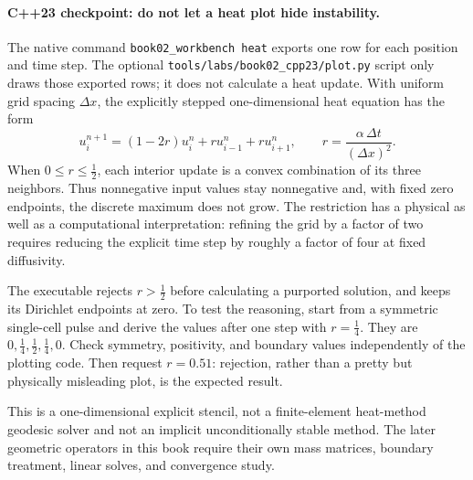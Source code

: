\begin{booktwolab}
\paragraph{C++23 checkpoint: do not let a heat plot hide instability.}
The native command \texttt{book02\_workbench heat} exports one row for
each position and time step. The optional
\texttt{tools/labs/book02\_cpp23/plot.py} script only draws those
exported rows; it does not calculate a heat update. With uniform grid
spacing \(\Delta x\), the explicitly stepped one-dimensional heat
equation has the form
\[
u_i^{n+1}=(1-2r)u_i^n+r u_{i-1}^n+r u_{i+1}^n,\qquad
r=\frac{\alpha\,\Delta t}{(\Delta x)^2}.
\]
When \(0\leq r\leq\tfrac12\), each interior update is a convex
combination of its three neighbors. Thus nonnegative input values
stay nonnegative and, with fixed zero endpoints, the discrete maximum
does not grow. The restriction has a physical as well as a computational
interpretation: refining the grid by a factor of two requires reducing
the explicit time step by roughly a factor of four at fixed diffusivity.

The executable rejects \(r>\tfrac12\) before calculating a purported
solution, and keeps its Dirichlet endpoints at zero. To test the
reasoning, start from a symmetric single-cell pulse and derive the
values after one step with \(r=\tfrac14\). They are \(0,\tfrac14,
\tfrac12,\tfrac14,0\). Check symmetry, positivity, and boundary
values independently of the plotting code. Then request
\(r=0.51\): rejection, rather than a pretty but physically misleading
plot, is the expected result.

\end{booktwolab}

\begin{booktwopitfall}
This is a one-dimensional explicit stencil, not a finite-element
heat-method geodesic solver and not an implicit unconditionally stable
method. The later geometric operators in this book require their own
mass matrices, boundary treatment, linear solves, and convergence study.

\end{booktwopitfall}
